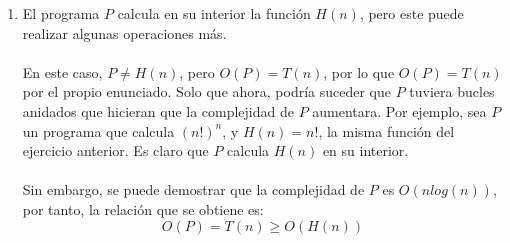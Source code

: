 \documentclass[11pt, a4paper]{exam}
\begin{document}
\begin{questions}
\begin{parts}
\begin{solution}
\begin{enumerate}
                \item El programa $P$ calcula en su interior la función $H(n)$, pero este puede realizar algunas operaciones más.
                \\
                \\
                En este caso, $P \neq H(n)$, pero $O(P) = T(n)$, por lo que $O(P) = T(n)$ por el propio enunciado. Solo que ahora, podría suceder que $P$ tuviera bucles anidados que hicieran que la complejidad de $P$ aumentara. Por ejemplo, sea $P$ un programa que calcula $(n!)^n$, y $H(n) = n!$, la misma función del ejercicio anterior. Es claro que $P$ calcula $H(n)$ en su interior. 
                \\
                \\
                Sin embargo, se puede demostrar que la complejidad de $P$ es $O(nlog(n))$, por tanto, la relación que se obtiene es:
                \begin{equation*}
                    O(P) = T(n) \geq O(H(n))  
                \end{equation*}
            \end{enumerate} 




        \end{solution}
    \end{parts}


\end{questions}
\end{document}
